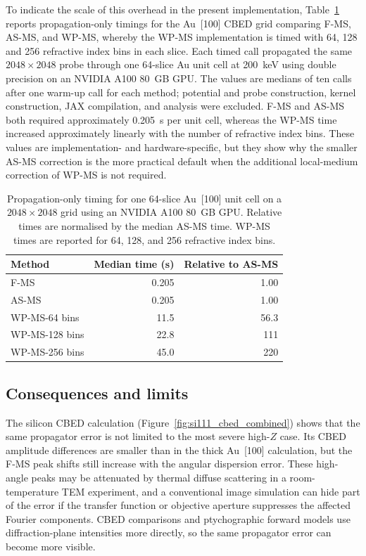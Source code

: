 \documentclass[preprint,12pt,number]{elsarticle}
\begin{document}
To indicate the scale of this overhead in the present implementation,
Table~\ref{tab:propagation_timing} reports propagation-only timings for the
Au~[100] CBED grid comparing F-MS, AS-MS, and WP-MS, whereby the WP-MS implementation
is timed with 64, 128 and 256 refractive index bins in each slice. Each timed call propagated the same $2048\times2048$
probe through one 64-slice Au unit cell at 200~keV using double precision on
an NVIDIA A100 80~GB GPU. The values are medians of ten calls after one
warm-up call for each method; potential and probe construction, kernel
construction, JAX compilation, and analysis were excluded. F-MS and AS-MS
both required approximately 0.205~s per unit cell, whereas the WP-MS time
increased approximately linearly with the number of refractive index bins. These
values are implementation- and hardware-specific, but they show why the
smaller AS-MS correction is the more practical default when the additional
local-medium correction of WP-MS is not required.

\begin{table}[H]
    \centering
    \caption{Propagation-only timing for one 64-slice Au~[100] unit cell on a
    $2048\times2048$ grid using an NVIDIA A100 80~GB GPU. Relative times are
    normalised by the median AS-MS time. WP-MS times are reported for 64, 128, and 256 refractive index bins.}
    \label{tab:propagation_timing}
    \begin{tabular}{lrr}
        \toprule
        \textbf{Method} & \textbf{Median time (s)} & \textbf{Relative to AS-MS} \\
        \midrule
        F-MS      & 0.205 & 1.00 \\
        AS-MS     & 0.205 & 1.00 \\
        WP-MS-64 bins  & 11.5  & 56.3 \\
        WP-MS-128 bins & 22.8  & 111  \\
        WP-MS-256 bins & 45.0  & 220  \\
        \bottomrule
    \end{tabular}
\end{table}

\subsection{Consequences and limits}

The silicon CBED calculation (Figure~\ref{fig:si111_cbed_combined}) shows that
the same propagator error is not limited to the most severe high-$Z$ case.
Its CBED amplitude differences are smaller than in the thick Au~[100]
calculation, but the F-MS peak shifts still increase with the angular dispersion error. These
high-angle peaks may be attenuated by thermal diffuse scattering in a
room-temperature TEM experiment, and a
conventional image simulation can hide part of the error if the transfer
function or objective aperture suppresses the affected Fourier components.
CBED comparisons and ptychographic forward models use diffraction-plane intensities more
directly, so the same propagator error can become more visible.
\end{document}
